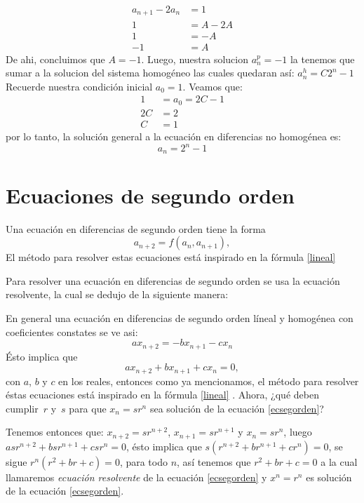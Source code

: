 \documentclass{report}
\begin{document}
\begin{align*}
  a_{n+1}-2a_{n}&=1\\
  1&=A-2A\\
  1&=-A\\
  -1&=A
\end{align*}
De ahi, concluimos que $A=-1$.
Luego, nuestra solucion $a_n^p=-1$ la tenemos que sumar a la solucion del sistema homogéneo las cuales quedaran así:
$a_{n}^h=C2^n-1$
Recuerde nuestra condición inicial $a_{0}=1$. Veamos que:
\begin{align*}
1&=a_{0}=2C-1\\
2C&=2\\
  C&=1
\end{align*}  
por lo tanto, la solución general a la ecuación en diferencias no homogénea es:
$$a_{n}=2^n-1$$


\chapter{Ecuaciones de segundo orden}

Una ecuación en diferencias de segundo orden tiene la forma
\begin{equation}
  \label{ecsegorden1}
  a_{n+2}=f(a_n,a_{n+1}),
\end{equation}
El método para resolver estas ecuaciones está inspirado en la fórmula \eqref{lineal} 

Para resolver una ecuación en diferencias de segundo orden se usa la
ecuación resolvente, la cual se dedujo de la siguiente manera:

En general una ecuación en diferencias de segundo orden líneal y homogénea con coeficientes constates se ve asi: $$ax_{n+2}=-bx_{n+1}-cx_{n}$$ Ésto implica que
\begin{equation}
  \label{ecsegorden}
  ax_{n+2}+bx_{n+1}+cx_{n}=0,
\end{equation}
con $a$, $b$ y $c$ en los reales, entonces como ya mencionamos, el método
para resolver éstas ecuaciones está inspirado en la fórmula \eqref{lineal}
. Ahora, ¿qué deben cumplir~$r$ y~$s$ para que $x_n=sr^n$
sea solución de la ecuación \eqref{ecsegorden}?

Tenemos entonces que: $x_{n+2}=sr^{n+2}$, $x_{n+1}=sr^{n+1}$ y
$x_{n}=sr^{n}$, luego~$asr^{n+2}+bsr^{n+1}+csr^n=0$, ésto implica que
$s(r^{n+2}+br^{n+1}+cr^n)=0$, se sigue $r^n (r^2+br+c)=0$, para todo
$n$, así tenemos que $r^2+br+c=0$ a la cual llamaremos
\textit{ecuación resolvente} de la ecuación \eqref{ecsegorden} y
$x^n=r^n$ es solución de la ecuación \eqref{ecsegorden}.
\end{document}
